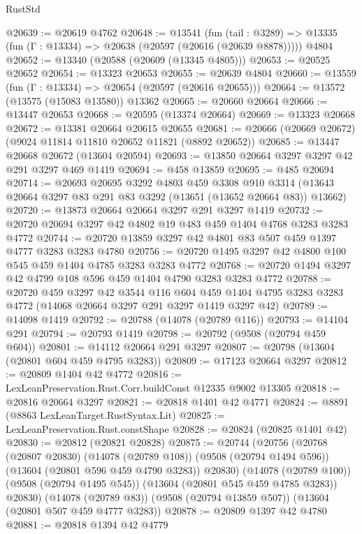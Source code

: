 \begin{lexlean}{RustStd}
\begin{coremodule}
@20639 := @20619 @4762
@20648 := @13541
    (fun (tail : @3289) => @13335 (fun (Γ : @13334) => @20638 (@20597 (@20616 (@20639 @8878)))))
    @4804
@20652 := @13340 (@20588 (@20609 (@13345 @4805)))
@20653 := @20525 @20652
@20654 := @13323 @20653
@20655 := @20639 @4804
@20660 := @13559 (fun (Γ : @13334) => @20654 (@20597 (@20616 @20655)))
@20664 := @13572 (@13575 (@15083 @13580)) @13362
@20665 := @20660 @20664
@20666 := @13447 @20653
@20668 := @20595 (@13374 @20664)
@20669 := @13323 @20668
@20672 := @13381 @20664 @20615 @20655
@20681 := @20666 (@20669 @20672) (@9024 @11814 @11810 @20652 @11821 (@8892 @20652))
@20685 := @13447 @20668 @20672 (@13604 @20594)
@20693 := @13850 @20664 @3297 @3297 @42 @291 @3297 @469 @1419
@20694 := @458 @13859
@20695 := @485 @20694
@20714 := @20693
    @20695
    @3292
    @4803
    @459
    @3308
    @910
    @3314
    (@13643 @20664 @3297 @83 @291 @83 @3292 (@13651 (@13652 @20664 @83)) @13662)
@20720 := @13873 @20664 @20664 @3297 @291 @3297 @1419
@20732 := @20720 @20694 @3297 @42 @4802 @19 @483 @459 @1404 @4768 @3283 @3283 @4772
@20744 := @20720 @13859 @3297 @42 @4801 @83 @507 @459 @1397 @4777 @3283 @3283 @4780
@20756 := @20720 @1495 @3297 @42 @4800 @100 @545 @459 @1404 @4785 @3283 @3283 @4772
@20768 := @20720 @1494 @3297 @42 @4799 @108 @596 @459 @1404 @4790 @3283 @3283 @4772
@20788 := @20720
    @459
    @3297
    @42
    @3544
    @116
    @604
    @459
    @1404
    @4795
    @3283
    @3283
    @4772
    (@14068 @20664 @3297 @291 @3297 @1419 @3297 @42)
@20789 := @14098 @1419
@20792 := @20788 (@14078 (@20789 @116))
@20793 := @14104 @291
@20794 := @20793 @1419
@20798 := @20792 (@9508 (@20794 @459 @604))
@20801 := @14112 @20664 @291 @3297
@20807 := @20798 (@13604 (@20801 @604 @459 @4795 @3283))
@20809 := @17123 @20664 @3297
@20812 := @20809 @1404 @42 @4772
@20816 := LexLeanPreservation.Rust.Corr.buildConst @12335 @9002 @13305
@20818 := @20816 @20664 @3297
@20821 := @20818 @1401 @42 @4771
@20824 := @8891 (@8863 LexLeanTarget.RustSyntax.Lit)
@20825 := LexLeanPreservation.Rust.constShape
@20828 := @20824 (@20825 @1401 @42)
@20830 := @20812 (@20821 @20828)
@20875 := @20744
    (@20756
      (@20768
        (@20807 @20830)
        (@14078 (@20789 @108))
        (@9508 (@20794 @1494 @596))
        (@13604 (@20801 @596 @459 @4790 @3283))
        @20830)
      (@14078 (@20789 @100))
      (@9508 (@20794 @1495 @545))
      (@13604 (@20801 @545 @459 @4785 @3283))
      @20830)
    (@14078 (@20789 @83))
    (@9508 (@20794 @13859 @507))
    (@13604 (@20801 @507 @459 @4777 @3283))
@20878 := @20809 @1397 @42 @4780
@20881 := @20818 @1394 @42 @4779

\end{coremodule}
\end{lexlean}
